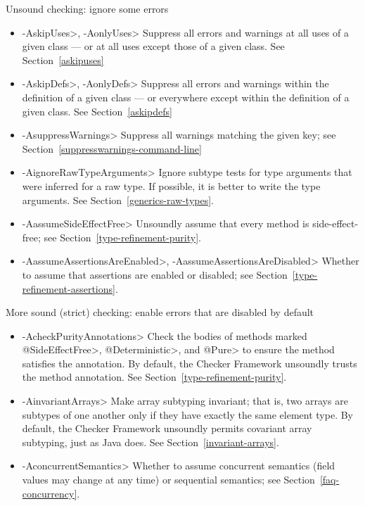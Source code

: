 Unsound checking: ignore some errors
\begin{itemize}
\item \<-AskipUses>, \<-AonlyUses> 
  Suppress all errors and warnings at all uses of a given class --- or at all
  uses except those of a given class.  See Section~\ref{askipuses}
\item \<-AskipDefs>, \<-AonlyDefs>
  Suppress all errors and warnings within the definition of a given class
  --- or everywhere except within the definition of a given class.  See
  Section~\ref{askipdefs}
\item \<-AsuppressWarnings>
  Suppress all warnings matching the given key; see
  Section~\ref{suppresswarnings-command-line}
\item \<-AignoreRawTypeArguments>
  Ignore subtype tests for type arguments that were inferred for a raw
  type.  If possible, it is better to write the type arguments.  See
  Section~\ref{generics-raw-types}.
\item \<-AassumeSideEffectFree>
  Unsoundly assume that every method is side-effect-free; see
  Section~\ref{type-refinement-purity}.
\item \<-AassumeAssertionsAreEnabled>, \<-AassumeAssertionsAreDisabled>
  Whether to assume that assertions are enabled or disabled; see Section~\ref{type-refinement-assertions}.
\end{itemize}

\label{unsound-by-default}
More sound (strict) checking: enable errors that are disabled by default
\begin{itemize}
\item \<-AcheckPurityAnnotations>
  Check the bodies of methods marked \<@SideEffectFree>, \<@Deterministic>,
  and \<@Pure> to ensure the method satisfies the annotation.  By default,
  the Checker Framework unsoundly trusts the method annotation.  See
  Section~\ref{type-refinement-purity}.
\item \<-AinvariantArrays>
  Make array subtyping invariant; that is, two arrays are subtypes of one
  another only if they have exactly the same element type.  By default,
  the Checker Framework unsoundly permits covariant array subtyping, just
  as Java does.  See Section~\ref{invariant-arrays}.
\item \<-AconcurrentSemantics>
  Whether to assume concurrent semantics (field values may change at any
  time) or sequential semantics; see Section~\ref{faq-concurrency}.
\end{itemize}

